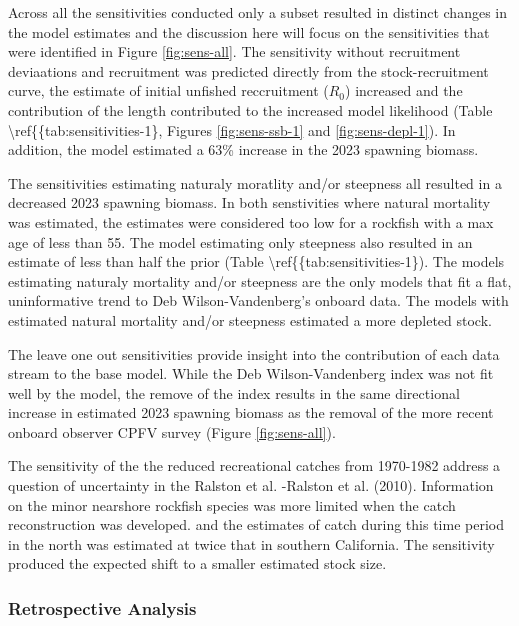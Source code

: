 \documentclass[11pt,
  english,
  letterpaper,
]{article}
\begin{document}
Across all the sensitivities conducted only a subset resulted in distinct changes in the model estimates and the discussion here will focus on the sensitivities that were identified in Figure \ref{fig:sens-all}. The sensitivity without recruitment deviaations and recruitment was predicted directly from the stock-recruitment curve, the estimate of initial unfished reccruitment (\(R_0\)) increased and the contribution of the length contributed to the increased model likelihood (Table \textbackslash ref\{\{tab:sensitivities-1\}, Figures \ref{fig:sens-ssb-1} and \ref{fig:sens-depl-1}). In addition, the model estimated a 63\% increase in the 2023 spawning biomass.

The sensitivities estimating naturaly moratlity and/or steepness all resulted in a decreased 2023 spawning biomass. In both senstivities where natural mortality was estimated, the estimates were considered too low for a rockfish with a max age of less than 55. The model estimating only steepness also resulted in an estimate of less than half the prior (Table \textbackslash ref\{\{tab:sensitivities-1\}). The models estimating naturaly mortality and/or steepness are the only models that fit a flat, uninformative trend to Deb Wilson-Vandenberg's onboard data. The models with estimated natural mortality and/or steepness estimated a more depleted stock.

The leave one out sensitivities provide insight into the contribution of each data stream to the base model. While the Deb Wilson-Vandenberg index was not fit well by the model, the remove of the index results in the same directional increase in estimated 2023 spawning biomass as the removal of the more recent onboard observer CPFV survey (Figure \ref{fig:sens-all}).

The sensitivity of the the reduced recreational catches from 1970-1982 address a question of uncertainty in the Ralston et al. -Ralston et al. (2010). Information on the minor nearshore rockfish species was more limited when the catch reconstruction was developed. and the estimates of catch during this time period in the north was estimated at twice that in southern California. The sensitivity produced the expected shift to a smaller estimated stock size.

\hypertarget{retrospective-analysis}{%
\subsubsection{Retrospective Analysis}\label{retrospective-analysis}}
\end{document}
